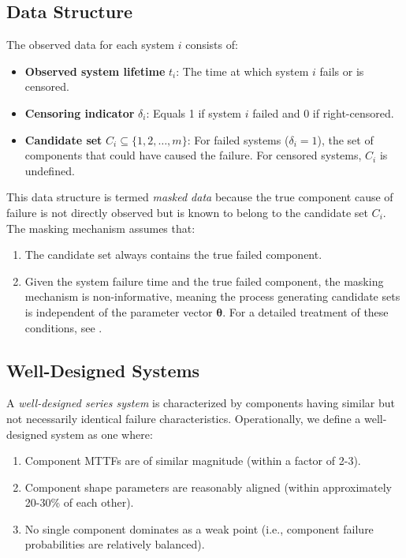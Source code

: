 \documentclass[11pt]{article}
\renewcommand{\v}[1]{\boldsymbol{#1}}
\begin{document}
\subsection{Data Structure}

The observed data for each system $i$ consists of:
\begin{itemize}
\item \textbf{Observed system lifetime} $t_i$: The time at which system $i$ fails or is censored.
\item \textbf{Censoring indicator} $\delta_i$: Equals 1 if system $i$ failed and 0 if right-censored.
\item \textbf{Candidate set} $C_i \subseteq \{1, 2, \ldots, m\}$: For failed systems ($\delta_i = 1$), the set of components that could have caused the failure. For censored systems, $C_i$ is undefined.
\end{itemize}

This data structure is termed \emph{masked data} because the true component cause of failure is not directly observed but is known to belong to the candidate set $C_i$. The masking mechanism assumes that:
\begin{enumerate}
\item The candidate set always contains the true failed component.
\item Given the system failure time and the true failed component, the masking mechanism is non-informative, meaning the process generating candidate sets is independent of the parameter vector $\v\theta$. For a detailed treatment of these conditions, see \cite{towell2023reliability}.
\end{enumerate}

\subsection{Well-Designed Systems}

A \emph{well-designed series system} is characterized by components having similar but not necessarily identical failure characteristics. Operationally, we define a well-designed system as one where:
\begin{enumerate}
\item Component MTTFs are of similar magnitude (within a factor of 2-3).
\item Component shape parameters are reasonably aligned (within approximately 20-30\% of each other).
\item No single component dominates as a weak point (i.e., component failure probabilities are relatively balanced).
\end{enumerate}
\end{document}
